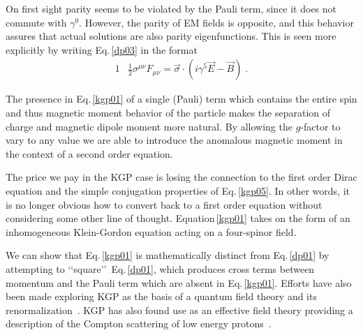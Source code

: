 \documentclass[epj]{svjour}
\begin{document}
On first sight parity seems to be violated by the Pauli term, since it does not commute with $\gamma^{0}$. However, the parity of EM fields is opposite, and this behavior assures that actual solutions are also parity eigenfunctions. This is seen more explicitly by writing Eq.\,\eqref{dp03} in the format
\begin{alignat}{1}
\label{kgp06} &\frac{1}{2}\sigma^{\mu\nu}F_{\mu\nu}=\vec{\sigma}\cdot\left(i\gamma^{5}\vec{E}-\vec{B}\right)\;.
\end{alignat}

The presence in Eq.\,\eqref{kgp01} of a single (Pauli) term which contains the entire spin and thus magnetic moment behavior of the particle makes the separation of charge and magnetic dipole moment more natural. By allowing the $g$-factor to vary to any value we are able to introduce the anomalous magnetic moment in the context of a second order equation.

The price we pay in the KGP case is losing the connection to the first order Dirac equation and the simple conjugation properties of Eq.\,\eqref{kgp05}. In other words, it is no longer obvious how to convert back to a first order equation without considering some other line of thought. Equation\,\eqref{kgp01} takes on the form of an inhomogeneous Klein-Gordon equation acting on a four-spinor field.

We can show that Eq.\,\eqref{kgp01} is mathematically distinct from Eq.\,\eqref{dp01} by attempting to \lq\lq square\rq\rq\ Eq.\,\eqref{dp01}, which produces cross terms between momentum and the Pauli term which are absent in Eq.\,\eqref{kgp01}. Efforts have also been made exploring KGP as the basis of a quantum field theory and its renormalization~\cite{Cortes:1992wr,AngelesMartinez:2011nt}. KGP has also found use as an effective field theory providing a description of the Compton scattering of low energy protons~\cite{DelgadoAcosta:2010nx}.
\end{document}
